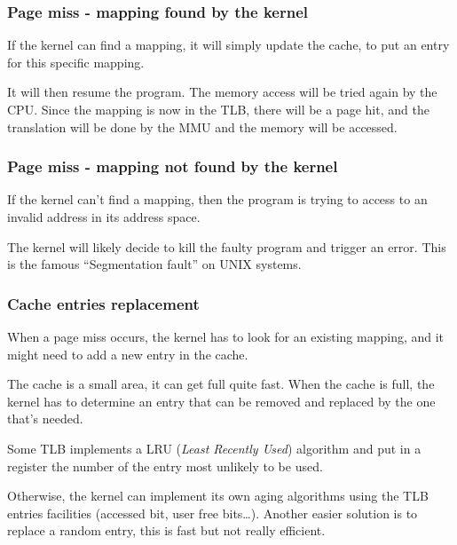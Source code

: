 \begin{frame}
  \frametitle{Page miss - mapping found by the kernel}

  If the kernel can find a mapping, it will simply update the cache, to put an entry for this specific mapping.

  \-

  It will then resume the program. The memory access will be tried again by the CPU. Since the mapping is now in the TLB, there will be a page hit, and the translation will be done by the MMU and the memory will be accessed.

\end{frame}

\begin{frame}
  \frametitle{Page miss - mapping not found by the kernel}

  If the kernel can't find a mapping, then the program is trying to access to an invalid address in its address space.

  \-

  The kernel will likely decide to kill the faulty program and trigger an error. This is the famous ``Segmentation fault'' on UNIX systems.

\end{frame}


\begin{frame}
  \frametitle{Cache entries replacement}

  When a page miss occurs, the kernel has to look for an existing mapping, and it might need to add a new entry in the cache.

  \-

  The cache is a small area, it can get full quite fast. When the cache is full, the kernel has to determine an entry that can be removed and replaced by the one that's needed.

  \-

  Some TLB implements a LRU (\emph{Least Recently Used}) algorithm and
  put in a register the number of the entry most unlikely to be used.

  \-

  Otherwise, the kernel can implement its own aging algorithms using
  the TLB entries facilities (accessed bit, user free
  bits\ldots). Another easier solution is to replace a random entry,
  this is fast but not really efficient.

\end{frame}

